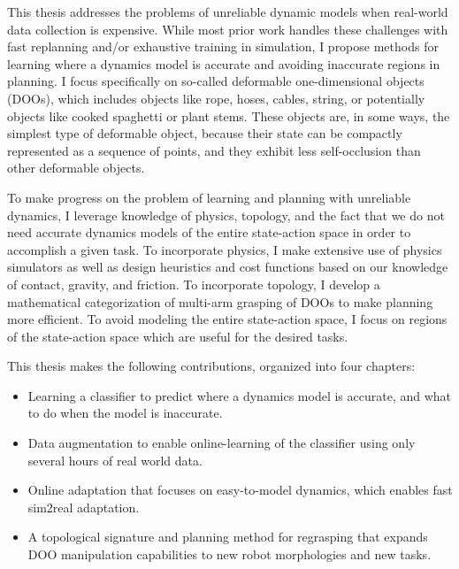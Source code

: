 This thesis addresses the problems of unreliable dynamic models when real-world data collection is expensive. While most prior work handles these challenges with fast replanning and/or exhaustive training in simulation, I propose methods for learning where a dynamics model is accurate and avoiding inaccurate regions in planning. I focus specifically on so-called deformable one-dimensional objects (DOOs), which includes objects like rope, hoses, cables, string, or potentially objects like cooked spaghetti or plant stems. These objects are, in some ways, the simplest type of deformable object, because their state can be compactly represented as a sequence of points, and they exhibit less self-occlusion than other deformable objects.

To make progress on the problem of learning and planning with unreliable dynamics, I leverage knowledge of physics, topology, and the fact that we do not need accurate dynamics models of the entire state-action space in order to accomplish a given task. To incorporate physics, I make extensive use of physics simulators as well as design heuristics and cost functions based on our knowledge of contact, gravity, and friction. To incorporate topology, I develop a mathematical categorization of multi-arm grasping of DOOs to make planning more efficient. To avoid modeling the entire state-action space, I focus on regions of the state-action space which are useful for the desired tasks.

This thesis makes the following contributions, organized into four chapters:

\begin{itemize}
    \item Learning a classifier to predict where a dynamics model is accurate, and what to do when the model is inaccurate.
    \item Data augmentation to enable online-learning of the classifier using only several hours of real world data.
    \item Online adaptation that focuses on easy-to-model dynamics, which enables fast sim2real adaptation.
    \item A topological signature and planning method for regrasping that expands DOO manipulation capabilities to new robot morphologies and new tasks.
\end{itemize}
